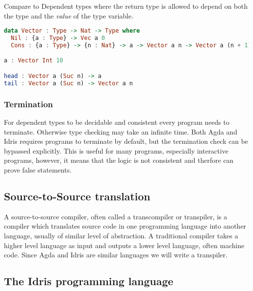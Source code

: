 \documentclass[parskip=half]{scrartcl}
\begin{document}
Compare to Dependent types where the return type is allowed to depend on both
the type and the \textit{value} of the type variable.

\begin{lstlisting}[language=Haskell]
data Vector : Type -> Nat -> Type where
  Nil : {a : Type} -> Vec a 0
  Cons : {a : Type} -> {n : Nat} -> a -> Vector a n -> Vector a (n + 1)

a : Vector Int 10

head : Vector a (Suc n) -> a
tail : Vector a (Suc n) -> Vector a n
\end{lstlisting}



\subsubsection{Termination}

For dependent types to be decidable and consistent every program needs to
terminate. Otherwise type checking may take an infinite time.  Both Agda and
Idris requires programs to terminate by default, but the termination check can
be bypassed explicitly. This is useful for many programs, especially
interactive programs, however, it means that the logic is not consistent and
therfore can prove false statements.

\subsection{Source-to-Source translation}

A source-to-source compiler, often called a transcompiler or transpiler, is
a compiler which translates source code in one programming language into
another language, usually of similar level of abstraction. A traditional
compiler takes a higher level language as input and outputs a lower level
language, often machine code.  Since Agda and Idris are similar languages we will write a transpiler.


\subsection{The Idris programming language}
\end{document}
